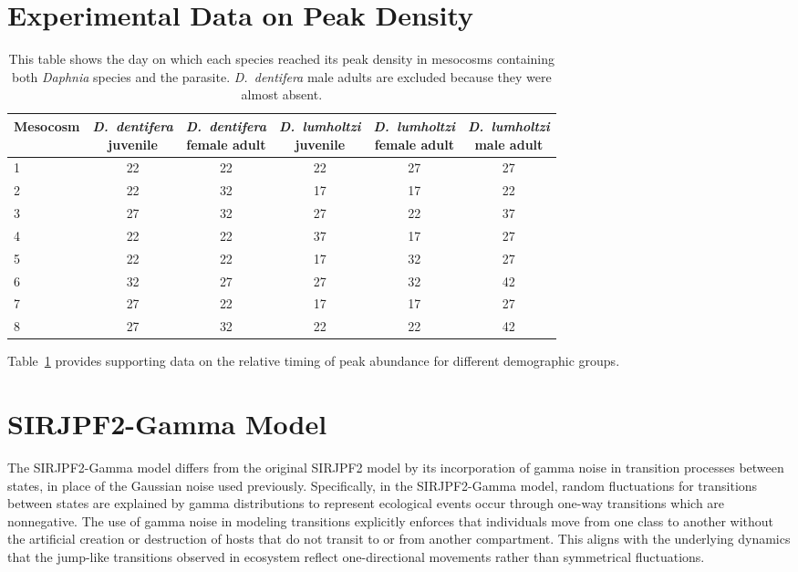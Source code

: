 \documentclass[aoas,preprint]{imsart}\usepackage[]{graphicx}\usepackage[]{xcolor}
\begin{document}
\section{Experimental Data on Peak Density}
\begin{table}[H]
\centering
\begin{tabular}{lccccc}
\toprule
Mesocosm
& \shortstack{\textit{D.~dentifera} \\ juvenile} 
& \shortstack{\textit{D.~dentifera} \\ female adult} 
& \shortstack{\textit{D.~lumholtzi} \\ juvenile} 
& \shortstack{\textit{D.~lumholtzi} \\ female adult} 
& \shortstack{\textit{D.~lumholtzi} \\ male adult} \\
\midrule
1 & 22 & 22 & 22 & 27 & 27 \\
2 & 22 & 32 & 17 & 17 & 22 \\
3 & 27 & 32 & 27 & 22 & 37 \\
4 & 22 & 22 & 37 & 17 & 27 \\
5 & 22 & 22 & 17 & 32 & 27 \\
6 & 32 & 27 & 27 & 32 & 42 \\
7 & 27 & 22 & 17 & 17 & 27 \\
8 & 27 & 32 & 22 & 22 & 42 \\
\bottomrule
\end{tabular}
\caption{This table shows the day on which each species reached its peak density in mesocosms containing both \textit{Daphnia} species and the parasite. \textit{D.~dentifera} male adults are excluded because they were almost absent.} \label{table:peak_density}
\end{table}

Table~\ref{table:peak_density} provides supporting data on the relative timing of peak abundance for different demographic groups.

\section{SIRJPF2-Gamma Model}
The SIRJPF2-Gamma model differs from the original SIRJPF2 model by its incorporation of gamma noise in transition processes between states, in place of the Gaussian noise used previously. 
Specifically, in the SIRJPF2-Gamma model, random fluctuations for transitions between states are explained by gamma distributions to represent ecological events occur through one-way transitions which are nonnegative. 
The use of gamma noise in modeling transitions explicitly enforces that individuals move from one class to another without the artificial creation or destruction of hosts that do not transit to or from another compartment.
This aligns with the underlying dynamics that the jump-like transitions observed in ecosystem reflect one-directional movements rather than symmetrical fluctuations.
\end{document}
